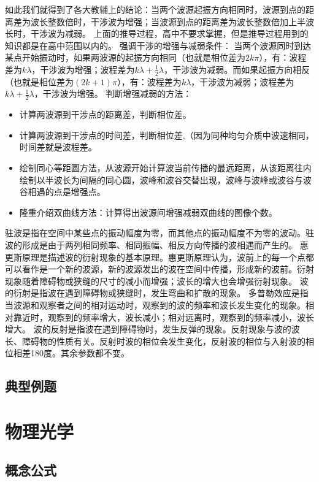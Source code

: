 \documentclass{lesson}
\begin{document}
如此我们就得到了各大教辅上的结论：当两个波源起振方向相同时，波源到点的距离差为波长整数倍时，干涉波为增强；当波源到点的距离差为波长整数倍加上半波长时，干涉波为减弱。
上面的推导过程，高中不要求掌握，但是推导过程用到的知识都是在高中范围以内的。
强调干涉的增强与减弱条件：
当两个波源同时到达某点开始振动时，如果两波源的起振方向相同（也就是相位差为$2k\pi$），有：波程差为$k\lambda$，干涉波为增强；波程差为$k\lambda+\frac12\lambda$，干涉波为减弱。而如果起振方向相反（也就是相位差为$(2k+1)\pi$），有：波程差为$k\lambda$，干涉波为减弱；波程差为$k\lambda+\frac12\lambda$，干涉波为增强。
判断增强减弱的方法：
\begin{itemize}
	\item 计算两波源到干涉点的距离差，判断相位差。
	\item 计算两波源到干涉点的时间差，判断相位差,（因为同种均匀介质中波速相同，时间差就是波程差。
	\item 绘制同心等距圆方法，从波源开始计算波当前传播的最远距离，从该距离往内绘制以半波长为间隔的同心圆，波峰和波谷交替出现，波峰与波峰或波谷与波谷相遇的点是增强点。
	\item 隆重介绍双曲线方法：计算得出波源间增强减弱双曲线的图像个数。
\end{itemize}
驻波是指在空间中某些点的振动幅度为零，而其他点的振动幅度不为零的波动。驻波的形成是由于两列相同频率、相同振幅、相反方向传播的波相遇而产生的。
惠更斯原理是描述波的衍射现象的基本原理。惠更斯原理认为，波前上的每一个点都可以看作是一个新的波源，新的波源发出的波在空间中传播，形成新的波前。衍射现象随着障碍物或狭缝的尺寸的减小而增强；波长的增大也会增强衍射现象。
波的衍射是指波在遇到障碍物或狭缝时，发生弯曲和扩散的现象。
多普勒效应是指当波源和观察者之间的相对运动时，观察到的波的频率和波长发生变化的现象。相对靠近时，观察到的频率增大，波长减小；相对远离时，观察到的频率减小，波长增大。
波的反射是指波在遇到障碍物时，发生反弹的现象。反射现象与波的波长、障碍物的性质有关。反射时波的相位会发生变化，反射波的相位与入射波的相位相差180度。其余参数都不变。
\subsection{典型例题}
\section{物理光学}
\subsection{概念公式}
\end{document}

